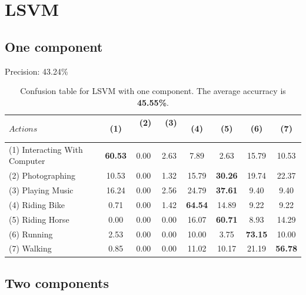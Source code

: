 \documentclass[10pt,a4paper]{llncs}
\begin{document}
\newpage
\section{LSVM}

\subsection{One component}

Precision: 43.24\%

\begin{table}[H]
\centering
\caption{Confusion table for LSVM with one component. The average accurracy is \textbf{45.55\%}.}
\label{table:LSVM1:Accuracy}
\begin{tabular}{|l|c|c|c|c|c|c|c|}
\hline
$Actions $ & $~~$(1)$~~$ & $~~$(2)$~~$ & $~~$(3)$~~$ & $~~$(4)$~~$ & $~~$(5)$~~$ & $~~$(6)$~~$ & $~~$(7)$~~$ \\ \hline
(1) Interacting With Computer & \cellcolor{lightgray}\textbf{60.53} & 0.00 & 2.63 & 7.89 & 2.63 & 15.79 & 10.53 \\ \hline
(2) Photographing             & 10.53 & 0.00 & 1.32 & 15.79 & \cellcolor{lightgray}\textbf{30.26} & 19.74 & 22.37 \\ \hline
(3) Playing Music             & 16.24 & 0.00 & 2.56 & 24.79 & \cellcolor{lightgray}\textbf{37.61} & 9.40 & 9.40 \\ \hline
(4) Riding Bike               & 0.71 & 0.00 & 1.42 & \cellcolor{lightgray}\textbf{64.54} & 14.89 & 9.22 & 9.22 \\ \hline
(5) Riding Horse              & 0.00 & 0.00 & 0.00 & 16.07 & \cellcolor{lightgray}\textbf{60.71} & 8.93 & 14.29 \\ \hline
(6) Running                   & 2.53 & 0.00 & 0.00 & 10.00 & 3.75 & \cellcolor{lightgray}\textbf{73.15} & 10.00 \\ \hline
(7) Walking                   & 0.85 & 0.00 & 0.00 & 11.02 & 10.17 & 21.19 & \cellcolor{lightgray}\textbf{56.78} \\ \hline
\end{tabular}
\end{table}



\subsection{Two components}
\end{document}
